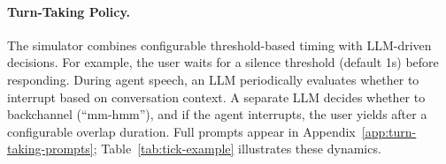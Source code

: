 \paragraph{Turn-Taking Policy.} The simulator combines configurable threshold-based timing with LLM-driven decisions. For example, the user waits for a silence threshold (default 1s) before responding. During agent speech, an LLM periodically evaluates whether to interrupt based on conversation context. A separate LLM decides whether to backchannel (``mm-hmm''), and if the agent interrupts, the user yields after a configurable overlap duration. Full prompts appear in Appendix~\ref{app:turn-taking-prompts}; Table~\ref{tab:tick-example} illustrates these dynamics.

